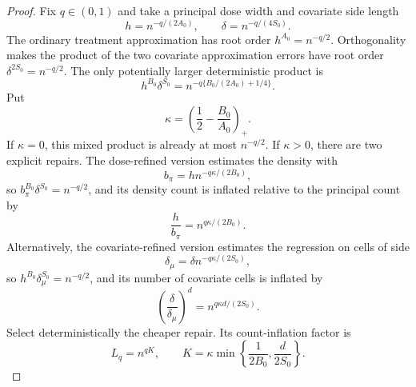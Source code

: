 \documentclass{article}
\begin{document}
\begin{proof}
Fix \(q\in(0,1)\) and take a principal dose width and covariate side length
\[
h=n^{-q/(2A_0)},
\qquad
\delta=n^{-q/(4S_0)}.
\]
The ordinary treatment approximation has root order \(h^{A_0}=n^{-q/2}\). Orthogonality makes the product of the two covariate approximation errors have root order \(\delta^{2S_0}=n^{-q/2}\). The only potentially larger deterministic product is
\[
h^{B_0}\delta^{S_0}=n^{-q\{B_0/(2A_0)+1/4\}}.
\]
Put
\[
\kappa=\left(\frac12-\frac{B_0}{A_0}\right)_+.
\]
If \(\kappa=0\), this mixed product is already at most \(n^{-q/2}\). If \(\kappa>0\), there are two explicit repairs. The dose-refined version estimates the density with
\[
b_\pi=h n^{-q\kappa/(2B_0)},
\]
so \(b_\pi^{B_0}\delta^{S_0}=n^{-q/2}\), and its density count is inflated relative to the principal count by
\[
\frac h{b_\pi}=n^{q\kappa/(2B_0)}.
\]
Alternatively, the covariate-refined version estimates the regression on cells of side
\[
\delta_\mu=\delta n^{-q\kappa/(2S_0)},
\]
so \(h^{B_0}\delta_\mu^{S_0}=n^{-q/2}\), and its number of covariate cells is inflated by
\[
\left(\frac\delta{\delta_\mu}\right)^d=n^{q\kappa d/(2S_0)}.
\]
Select deterministically the cheaper repair. Its count-inflation factor is
\[
L_q=n^{qK},
\qquad
K=\kappa\min\left\{\frac1{2B_0},\frac d{2S_0}\right\}.
\]


\end{proof}
\end{document}
